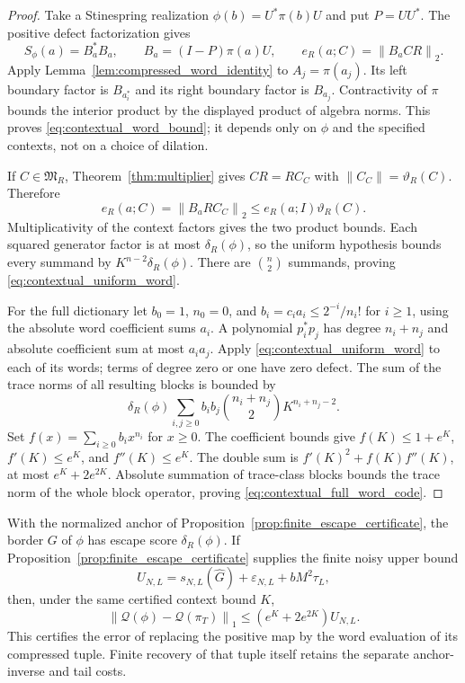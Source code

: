 \documentclass[11pt,a4paper]{amsart}
\numberwithin{equation}{section}
\theoremstyle{definition}
\theoremstyle{remark}
\newcommand{\norm}[1]{\left\lVert#1\right\rVert}
\begin{document}
\begin{proof}
Take a Stinespring realization $\phi(b)=U^*\pi(b)U$ and put $P=UU^*$. The positive defect factorization gives
\[
 S_\phi(a)=B_a^*B_a,
 \qquad B_a=(I-P)\pi(a)U,
 \qquad e_R(a;C)=\norm{B_aCR}_2.
\]
Apply Lemma~\ref{lem:compressed_word_identity} to $A_j=\pi(a_j)$. Its left boundary factor is $B_{a_i^*}$ and its right boundary factor is $B_{a_j}$. Contractivity of $\pi$ bounds the interior product by the displayed product of algebra norms. This proves \eqref{eq:contextual_word_bound}; it depends only on $\phi$ and the specified contexts, not on a choice of dilation.

If $C\in\mathfrak M_R$, Theorem~\ref{thm:multiplier} gives $CR=RC_C$ with $\norm{C_C}=\vartheta_R(C)$. Therefore
\[
 e_R(a;C)=\norm{B_aRC_C}_2
 \le e_R(a;I)\vartheta_R(C).
\]
Multiplicativity of the context factors gives the two product bounds. Each squared generator factor is at most $\delta_R(\phi)$, so the uniform hypothesis bounds every summand by $K^{n-2}\delta_R(\phi)$. There are $\binom n2$ summands, proving \eqref{eq:contextual_uniform_word}.

For the full dictionary let $b_0=1$, $n_0=0$, and $b_i=c_ia_i\le2^{-i}/n_i!$ for $i\ge1$, using the absolute word coefficient sums $a_i$. A polynomial $p_i^*p_j$ has degree $n_i+n_j$ and absolute coefficient sum at most $a_ia_j$. Apply \eqref{eq:contextual_uniform_word} to each of its words; terms of degree zero or one have zero defect. The sum of the trace norms of all resulting blocks is bounded by
\[
 \delta_R(\phi)\sum_{i,j\ge0}b_ib_j
        \binom{n_i+n_j}{2}K^{n_i+n_j-2}.
\]
Set $f(x)=\sum_{i\ge0}b_ix^{n_i}$ for $x\ge0$. The coefficient bounds give
$f(K)\le1+e^K$, $f'(K)\le e^K$, and $f''(K)\le e^K$.
The double sum is $f'(K)^2+f(K)f''(K)$, at most $e^K+2e^{2K}$. Absolute summation of trace-class blocks bounds the trace norm of the whole block operator, proving \eqref{eq:contextual_full_word_code}.
\end{proof}

With the normalized anchor of Proposition~\ref{prop:finite_escape_certificate}, the border $G$ of $\phi$ has escape score $\delta_R(\phi)$. If Proposition~\ref{prop:finite_escape_certificate} supplies the finite noisy upper bound
\[
 U_{N,L}=s_{N,L}(\widehat G)+\varepsilon_{N,L}+bM^2\tau_L,
\]
then, under the same certified context bound $K$,
\begin{equation}\label{eq:finite_multiplicativity_certificate}
 \norm{\mathcal Q(\phi)-\mathcal Q(\pi_T)}_1
 \le(e^K+2e^{2K})U_{N,L}.
\end{equation}
This certifies the error of replacing the positive map by the word evaluation of its compressed tuple. Finite recovery of that tuple itself retains the separate anchor-inverse and tail costs.
\end{document}

